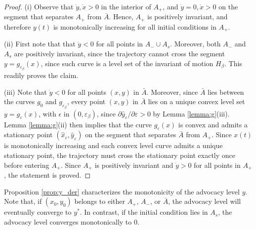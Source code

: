 \documentclass{article}
\begin{document}
\begin{proof}
(i) Observe that $\dot y, \dot x > 0$ in the interior of $A_+$, and $\dot y = 0, \dot x > 0$ on the segment that separates $A_+$ from $\bar A$. Hence, $A_+$ is positively invariant, and therefore $y(t)$ is monotonically increasing for all initial conditions in $A_+$.

(ii) First note that that $\dot y < 0$ for all points in $A_-\cup A_s$. Moreover, both $A_-$ and $A_s$ are positively invariant, since the trajectory cannot cross the segment $y = g_{\varepsilon_\beta}(x)$, since such curve is a level set of the invariant of motion $H_\beta$. This readily proves the claim. 

(iii) Note that $\dot y < 0$ for all points $(x,y)$ in $\bar A$. Moreover, since $\bar A$ lies between the curves $g_{0}$ and $g_{\varepsilon_\beta}$, every point $(x,y)$ in $\bar A$ lies on a unique convex level set $y = g_{\varepsilon}(x)$, with $\epsilon$ in $(0,\varepsilon_\beta)$, since $\partial \hat y_\varepsilon / \partial \varepsilon > 0$ by Lemma \ref{lemma:g}(iii). Lemma \ref{lemma:g}(ii) then implies that the curve $g_\varepsilon(x)$ is convex and admits a stationary point $(\hat x_\varepsilon,\hat y_\varepsilon)$ on the segment that separates $\bar A$ from $A_+$. Since $x(t)$ is monotonically increasing and each convex level curve admits a unique stationary point, the trajectory must cross the stationary point exactly once before entering $A_
+$. Since $A_+$ is positively invariant and $\dot y > 0$ for all points in $A_+$, the statement is proved. 
\end{proof}

Proposition \ref{prop:y_der} characterizes the monotonicity of the advocacy level $y$. Note that, if $(x_0,y_0)$ belongs to either $A_+$, $A_-$, or $\bar A$, the advocacy level will eventually converge to $y^*$. In contrast, if the initial condition lies in $A_s$, the advocacy level converges monotonically to $0$.
\end{document}
